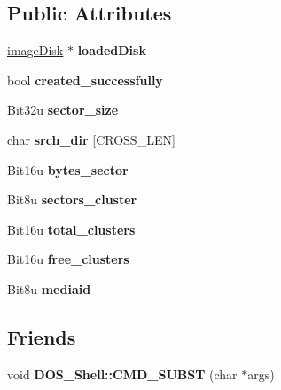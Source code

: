 \subsection*{Public Attributes}
\begin{DoxyCompactItemize}
\item 
\hypertarget{classfatDrive_a3a263d1b8a02f7aff910fe9ab2347b4f}{\hyperlink{classimageDisk}{image\-Disk} $\ast$ {\bfseries loaded\-Disk}}\label{classfatDrive_a3a263d1b8a02f7aff910fe9ab2347b4f}

\item 
\hypertarget{classfatDrive_ae3927936196f98009856fc9f46f1065a}{bool {\bfseries created\-\_\-successfully}}\label{classfatDrive_ae3927936196f98009856fc9f46f1065a}

\item 
\hypertarget{classfatDrive_ac8107e7154b762ea45805c3eec97b3dd}{Bit32u {\bfseries sector\-\_\-size}}\label{classfatDrive_ac8107e7154b762ea45805c3eec97b3dd}

\item 
\hypertarget{classfatDrive_a87c406b52e2ede2b0d6d19df26e66184}{char {\bfseries srch\-\_\-dir} \mbox{[}C\-R\-O\-S\-S\-\_\-\-L\-E\-N\mbox{]}}\label{classfatDrive_a87c406b52e2ede2b0d6d19df26e66184}

\item 
\hypertarget{classfatDrive_a342b82338d182099e1de415a2296ee53}{Bit16u {\bfseries bytes\-\_\-sector}}\label{classfatDrive_a342b82338d182099e1de415a2296ee53}

\item 
\hypertarget{classfatDrive_aaba7c7638ee28c29d91ef7cf656f4e5c}{Bit8u {\bfseries sectors\-\_\-cluster}}\label{classfatDrive_aaba7c7638ee28c29d91ef7cf656f4e5c}

\item 
\hypertarget{classfatDrive_a85eca1f2d4a5e13fc25435b01eea3b64}{Bit16u {\bfseries total\-\_\-clusters}}\label{classfatDrive_a85eca1f2d4a5e13fc25435b01eea3b64}

\item 
\hypertarget{classfatDrive_a3da9f308f747d9e0682c032474594de9}{Bit16u {\bfseries free\-\_\-clusters}}\label{classfatDrive_a3da9f308f747d9e0682c032474594de9}

\item 
\hypertarget{classfatDrive_a44fa7ae4eff20a4f7391c131ef713746}{Bit8u {\bfseries mediaid}}\label{classfatDrive_a44fa7ae4eff20a4f7391c131ef713746}

\end{DoxyCompactItemize}
\subsection*{Friends}
\begin{DoxyCompactItemize}
\item 
\hypertarget{classfatDrive_a0d22a35db1d3ebd10c7ef057a1f89fec}{void {\bfseries D\-O\-S\-\_\-\-Shell\-::\-C\-M\-D\-\_\-\-S\-U\-B\-S\-T} (char $\ast$args)}\label{classfatDrive_a0d22a35db1d3ebd10c7ef057a1f89fec}

\end{DoxyCompactItemize}



